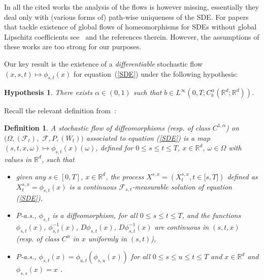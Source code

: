 \documentclass[a4paper,11pt]{article}
\newtheorem{definition}[theorem]{Definition}
\newtheorem{hypothesis}{Hypothesis}
\begin{document}
In all the cited works the analysis of the flows is however missing,
essentially they deal only with (various forms of) path-wise uniqueness of
the SDE. For papers that tackle existence of global flows of homeomorphisms
for SDEs without global Lipschitz coefficients see~\cite{Zhang, FIZ} and the
references therein. However, the assumptions of these works are too strong
for our purposes.

\bigskip

Our key result is the existence of a \emph{differentiable} stochastic flow $%
(x,s,t)\mapsto \phi _{s,t}(x)$ for equation~(\ref{SDE}) under the following
hypothesis:

\begin{hypothesis}
\label{hy1} There exists ${\alpha }\in (0,1)$ such that $b\in L^{\infty
}\left( 0,T;C_{b}^{\alpha }({\mathbb{R}}^{d};{\mathbb{R}}^{d})\right) $.
\end{hypothesis}

Recall the relevant definition from~\cite{K}:

\begin{definition}
A \emph{stochastic flow of diffeomorphisms} (resp. \emph{of class} $%
C^{1,\alpha }$) on $(\Omega ,\left( \mathcal{F}{}_{t}\right) ,$ ${}\mathcal{F%
},P,\left( W_{t}\right) )$ associated to equation (\ref{SDE}) is a map $%
(s,t,x,\omega )\mapsto \phi _{s,t}(x)\left( \omega \right) $, defined for $%
0\leq s\leq t\leq T$, $x\in {\mathbb{R}}^{d}$, $\omega \in \Omega $ with
values in ${\mathbb{R}}^{d}$, such that

\begin{itemize}
\item[(a)]  given any $s\in \left[ 0,T\right] $, $x\in {\mathbb{R}}^{d}$,
the process $X^{s,x}=(X_{t}^{s,x},t\in \lbrack s,T])$ defined as $%
X_{t}^{s,x}=\phi _{s,t}(x)$ is a continuous $\mathcal{F}_{s,t}$-measurable
solution of equation (\ref{SDE}),

\item[(b)]  $P$-a.s., $\phi _{s,t}$ is a diffeomorphism, for all $0\leq
s\leq t\leq T$, and the functions $\phi _{s,t}(x)$, $\phi _{s,t}^{-1}(x)$, $%
D\phi _{s,t}(x)$, $D\phi _{s,t}^{-1}(x)$ are continuous in $(s,t,x)$ (resp.
of class $C^{\alpha }$ in $x$ uniformly in $(s,t)$),

\item[(c)]  $P$-a.s., $\phi _{s,t}(x)=\phi _{u,t}(\phi _{s,u}(x))$ for all $%
0\leq s\leq u\leq t\leq T$ and $x\in {\mathbb{R}}^{d}$ and $\phi _{s,s}(x)=x$%
.
\end{itemize}
\end{definition}
\end{document}
